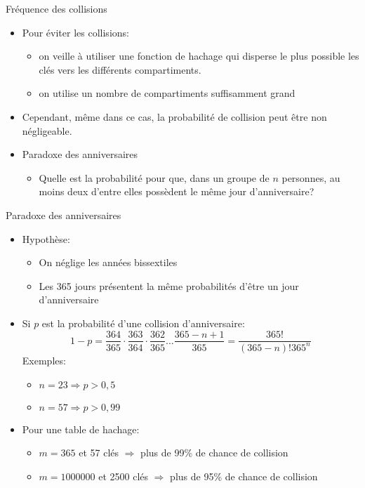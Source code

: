 \begin{frame}{Fréquence des collisions}

\begin{itemize}
\item Pour éviter les collisions:
\begin{itemize}
\item on veille à utiliser une fonction de hachage qui disperse le
  plus possible les clés vers les différents compartiments.
\item on utilise un nombre de compartiments suffisamment grand
\end{itemize}
\item Cependant, même dans ce cas, la probabilité de collision peut
  être non négligeable.

\bigskip

\item \alert{Paradoxe des anniversaires}
\begin{itemize}
\item Quelle est la probabilité pour que, dans un groupe de $n$ personnes, au moins deux d'entre elles possèdent le même jour d'anniversaire?
\end{itemize}
\end{itemize}

\end{frame}

\begin{frame}{Paradoxe des anniversaires}

\begin{itemize}
\item Hypothèse:
\begin{itemize}
\item On néglige les années bissextiles
\item Les 365 jours présentent la même probabilités d'être un jour d'anniversaire
\end{itemize}
\item Si $p$ est la probabilité d'une collision d'anniversaire:
$$1-p = \frac{364}{365} \cdot \frac{363}{364} \cdot \frac{362}{365} \ldots \frac{365-n+1}{365} = \frac{365!}{(365-n)! 365^n}$$
Exemples:
\begin{itemize}
\item $n=23 \Rightarrow p>0,5$
\item $n=57 \Rightarrow p>0,99$
\end{itemize}
\bigskip

\item Pour une table de hachage:
\begin{itemize}
\item $m=365$ et 57 clés $\Rightarrow$ plus de 99\% de chance de collision
\item $m=1000000$ et 2500 clés $\Rightarrow$ plus de 95\% de chance de collision
\end{itemize}
\end{itemize}

\end{frame}


